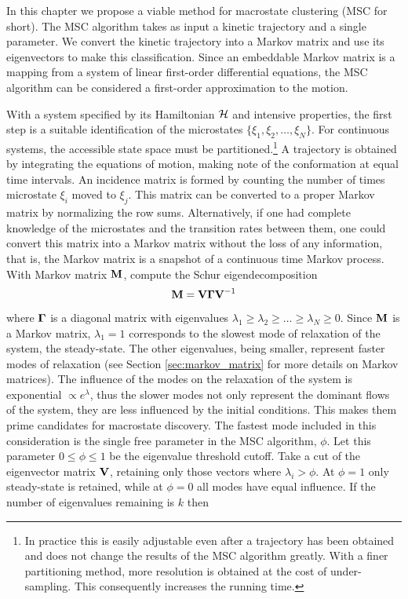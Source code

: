In this chapter we propose a viable method for macrostate clustering (MSC for short). The MSC algorithm takes as input a kinetic trajectory and a single parameter. We convert the kinetic trajectory into a Markov matrix and use its eigenvectors to make this classification. Since an embeddable Markov matrix is a mapping from a system of linear first-order differential equations, the MSC algorithm can be considered a first-order approximation to the motion.

With a system specified by its Hamiltonian $\mathcal{H}$ and intensive properties, the first step is a suitable identification of the microstates $\{\xi_1, \xi_2,\ldots, \xi_N \}$. For continuous systems, the accessible state space must be partitioned.\footnote{In practice this is easily adjustable even after a trajectory has been obtained and does not change the results of the MSC algorithm greatly. With a finer partitioning method, more resolution is obtained at the cost of under-sampling. This consequently increases the running time.}  A trajectory is obtained by integrating the equations of motion, making note of the conformation at equal time intervals. An incidence matrix is formed by counting the number of times microstate $\xi_i$ moved to $\xi_j$. This matrix can be converted to a proper Markov matrix by normalizing the row sums. Alternatively, if one had complete knowledge of the microstates and the transition rates between them, one could convert this matrix into a Markov matrix without the loss of any information, that is, the Markov matrix is a snapshot of a continuous time Markov process. With Markov matrix ${\bf M}$, compute the Schur eigendecomposition
\begin{equation}
  {\bf M} = {\bf V \Gamma V}^{-1}
\end{equation}
where ${\bf \Gamma}$ is a diagonal matrix with  eigenvalues $\lambda_1 \geq \lambda_2 \geq \ldots \geq \lambda_N \geq 0$. Since ${\bf M}$ is a Markov matrix, $\lambda_1=1$ corresponds to the slowest mode of relaxation of the system, \ie the steady-state. The other eigenvalues, being smaller, represent faster modes of relaxation (see Section \ref{sec:markov_matrix} for more details on Markov matrices). The influence of the modes on the relaxation of the system is exponential $\propto e^\lambda$, thus the slower modes not only represent the dominant flows of the system, they are less influenced by the initial conditions. This makes them prime candidates for macrostate discovery. The fastest mode included in this consideration is the single free parameter in the MSC algorithm, $\phi$. Let this parameter $0 \le \phi \le 1$ be the eigenvalue threshold cutoff. Take a cut of the eigenvector matrix ${\bf V}$, retaining only those vectors where $\lambda_i > \phi$. At $\phi=1$ only steady-state is retained, while at $\phi=0$ all modes have equal influence.  If the number of eigenvalues remaining is $k$ then 
